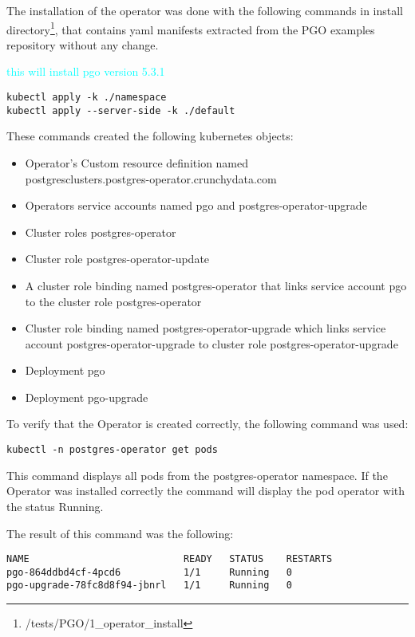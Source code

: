 The installation of the operator was done with the following commands in install directory\footnote{/tests/PGO/1\_operator\_install}, that contains yaml manifests extracted from the PGO examples repository without any change.

\textcolor{cyan}{this will install pgo version 5.3.1}

\begin{verbatim}
kubectl apply -k ./namespace
kubectl apply --server-side -k ./default
\end{verbatim}

These commands created the following kubernetes objects:
\begin{itemize}
    \item Operator's Custom resource definition named \\postgresclusters.postgres-operator.crunchydata.com
    \item Operators service accounts named pgo and postgres-operator-upgrade
    \item Cluster roles postgres-operator
    \item Cluster role postgres-operator-update
    \item A cluster role binding named postgres-operator that links service account pgo to the cluster role postgres-operator
    \item Cluster role binding named postgres-operator-upgrade which links service account postgres-operator-upgrade to cluster role postgres-operator-upgrade
    \item Deployment pgo
    \item Deployment pgo-upgrade
\end{itemize}


To verify that the Operator is created correctly, the following command was used:
\begin{verbatim}
kubectl -n postgres-operator get pods
\end{verbatim}

This command displays all pods from the postgres-operator namespace. If the Operator was installed correctly the command will display the pod operator with the status Running.

The result of this command was the following:
\begin{verbatim}
NAME                           READY   STATUS    RESTARTS
pgo-864ddbd4cf-4pcd6           1/1     Running   0
pgo-upgrade-78fc8d8f94-jbnrl   1/1     Running   0 
\end{verbatim}

